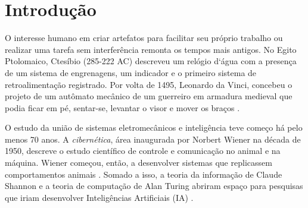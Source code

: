\chapter{Introdução}
\label{chap:Intro}


\par O interesse humano em criar artefatos para facilitar seu próprio trabalho ou realizar uma tarefa sem interferência remonta os tempos mais antigos. No Egito Ptolomaico, Ctesíbio (285-222 AC) descreveu um relógio d`água com a presença de um sistema de engrenagens, um indicador e o primeiro sistema de retroalimentação registrado. Por volta de 1495, Leonardo da Vinci, concebeu o projeto de um autômato mecânico de um guerreiro em armadura medieval que podia ficar em pé, sentar-se, levantar o visor e mover os braços \cite{guarnieri2010}. 
\par O estudo da união de sistemas eletromecânicos e inteligência teve começo há pelo menos 70 anos. A \textit{cibernética}, área inaugurada por Norbert Wiener na década de 1950, descreve o estudo científico de controle e comunicação no animal e na máquina. Wiener começou, então, a desenvolver sistemas que replicassem comportamentos animais \cite{wiener1950}. Somado a isso, a teoria da informação de Claude Shannon e a teoria de computação de Alan Turing abriram espaço para pesquisas que iriam desenvolver Inteligências Artificiais (IA) \cite{pamela2004}.

